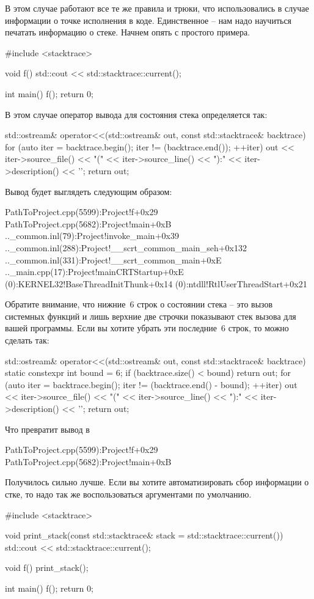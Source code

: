 В этом случае работают все те же правила и трюки, что использовались в случае информации о точке исполнения в коде.
Единственное -- нам надо научиться печатать информацию о стеке.
Начнем опять с простого примера.
\begin{cppcode}
#include <stacktrace>

void f() {
  std::cout << std::stacktrace::current();
}

int main() {
  f();
  return 0;
}
\end{cppcode}
В этом случае оператор вывода для состояния стека определяется так:
\begin{cppcode}
std::ostream& operator<<(std::ostream& out, const std::stacktrace& backtrace) {
  for (auto iter = backtrace.begin(); iter != (backtrace.end()); ++iter) {
    out << iter->source_file() << "(" << iter->source_line()
        << "):" << iter->description() << '\n';
  }
  return out;
}
\end{cppcode}
Вывод будет выглядеть следующим образом:
\begin{cppcode}
PathToProject\main.cpp(5599):Project!f+0x29
PathToProject\main.cpp(5682):Project!main+0xB
..\exe_common.inl(79):Project!invoke_main+0x39
..\exe_common.inl(288):Project!__scrt_common_main_seh+0x132
..\exe_common.inl(331):Project!__scrt_common_main+0xE
..\exe_main.cpp(17):Project!mainCRTStartup+0xE
(0):KERNEL32!BaseThreadInitThunk+0x14
(0):ntdll!RtlUserThreadStart+0x21
\end{cppcode}
Обратите внимание, что нижние~$6$ строк о состоянии стека -- это вызов системных функций и лишь верхние две строчки показывают стек вызова для вашей программы.
Если вы хотите убрать эти последние~$6$ строк, то можно сделать так:
\begin{cppcode}
std::ostream& operator<<(std::ostream& out, const std::stacktrace& backtrace) {
  static constexpr int bound = 6;
  if (backtrace.size() < bound)
    return out;
  for (auto iter = backtrace.begin(); iter != (backtrace.end() - bound); ++iter) {
    out << iter->source_file() << "(" << iter->source_line()
        << "):" << iter->description() << '\n';
  }
  return out;
}
\end{cppcode}
Что превратит вывод в
\begin{cppcode}
PathToProject\main.cpp(5599):Project!f+0x29
PathToProject\main.cpp(5682):Project!main+0xB
\end{cppcode}
Получилось сильно лучше.
Если вы хотите автоматизировать сбор информации о стке, то надо так же воспользоваться аргументами по умолчанию.
\begin{cppcode}
#include <stacktrace>

void print_stack(const std::stacktrace& stack = std::stacktrace::current()) {
  std::cout << std::stacktrace::current();
}

void f() {
  print_stack();
}

int main() {
  f();
  return 0;
}
\end{cppcode}

